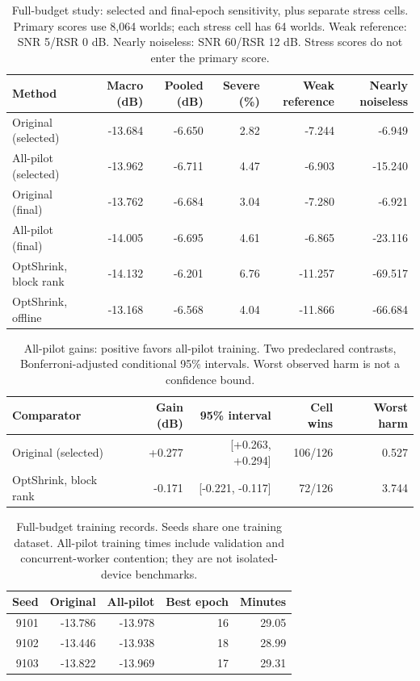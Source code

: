 \begin{table}[!t]
\caption{Full-budget study: selected and final-epoch sensitivity, plus separate stress cells. Primary scores use 8,064 worlds; each stress cell has 64 worlds. Weak reference: SNR 5/RSR 0 dB. Nearly noiseless: SNR 60/RSR 12 dB. Stress scores do not enter the primary score.}
\label{tab:training-full}\centering\footnotesize
\setlength{\tabcolsep}{3pt}
\begin{tabular}{@{}lrrrrr@{}}\toprule
Method & Macro (dB) & Pooled (dB) & Severe (\%) & Weak reference & Nearly noiseless\\
\midrule
Original (selected) & -13.684 & -6.650 & 2.82 & -7.244 & -6.949\\
All-pilot (selected) & -13.962 & -6.711 & 4.47 & -6.903 & -15.240\\
Original (final) & -13.762 & -6.684 & 3.04 & -7.280 & -6.921\\
All-pilot (final) & -14.005 & -6.695 & 4.61 & -6.865 & -23.116\\
OptShrink, block rank & -14.132 & -6.201 & 6.76 & -11.257 & -69.517\\
OptShrink, offline & -13.168 & -6.568 & 4.04 & -11.866 & -66.684\\
\bottomrule
\end{tabular}
\end{table}

\begin{table}[!t]
\caption{All-pilot gains: positive favors all-pilot training. Two predeclared contrasts, Bonferroni-adjusted conditional 95\% intervals. Worst observed harm is not a confidence bound.}
\label{tab:training-contrasts}\centering\footnotesize
\setlength{\tabcolsep}{3pt}
\begin{tabular}{@{}lrrrr@{}}\toprule
Comparator & Gain (dB) & 95\% interval & Cell wins & Worst harm\\
\midrule
Original (selected) & +0.277 & [+0.263, +0.294] & 106/126 & 0.527\\
OptShrink, block rank & -0.171 & [-0.221, -0.117] & 72/126 & 3.744\\
\bottomrule
\end{tabular}
\end{table}

\begin{table}[!t]
\caption{Full-budget training records. Seeds share one training dataset. All-pilot training times include validation and concurrent-worker contention; they are not isolated-device benchmarks.}
\label{tab:training-seeds}\centering\footnotesize
\setlength{\tabcolsep}{3pt}
\begin{tabular}{@{}rrrrr@{}}\toprule
Seed & Original & All-pilot & Best epoch & Minutes\\
\midrule
9101 & -13.786 & -13.978 & 16 & 29.05\\
9102 & -13.446 & -13.938 & 18 & 28.99\\
9103 & -13.822 & -13.969 & 17 & 29.31\\
\bottomrule
\end{tabular}
\end{table}

